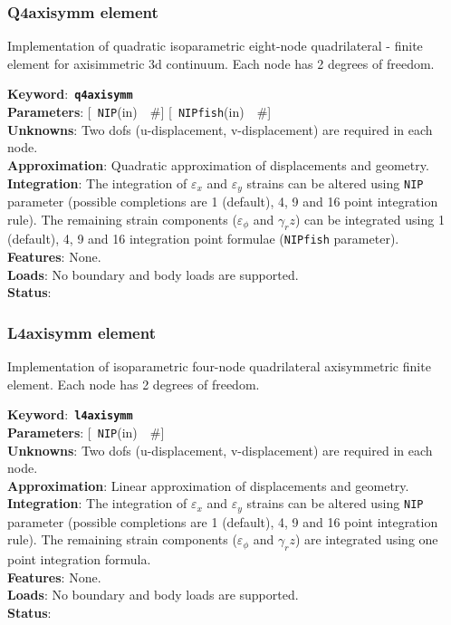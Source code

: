\documentclass[a4paper]{article}
\newcommand{\descitem}[1]{{\noindent \bf #1}:}
\newcommand{\elemkeyword}[1]{\descitem{Keyword}~{\bf \texttt{#1}}}
\newcommand{\elemparam}[2]{{{\texttt{#1}\tiny (#2)}~~\#}}
\newcommand{\optelemparam}[2]{{[~\elemparam{#1}{#2}]}}
\newcommand{\param}[1]{{\texttt{#1}}}
\begin{document}
\subsubsection{Q4axisymm element}
Implementation of quadratic isoparametric eight-node quadrilateral -
finite element for axisimmetric 3d continuum. 
Each node has 2 degrees of freedom.

\elemkeyword{q4axisymm}\\
\descitem{Parameters} \optelemparam{NIP}{in} \optelemparam{NIPfish}{in}\\
\descitem{Unknowns}
Two dofs (u-displacement, v-displacement) are required in each node.\\
\descitem{Approximation} Quadratic approximation of displacements and
geometry.\\
\descitem{Integration}
The integration of $\varepsilon_x$ and $\varepsilon_y$ strains can be altered using
\param{NIP} parameter (possible completions are 1 (default), 4, 9 and 16
point integration rule). The remaining strain components ($\varepsilon_\phi$ and
$\gamma_rz$) can be integrated using 1 (default), 4, 9 and 16 integration
point formulae (\param{NIPfish} parameter).\\
\descitem{Features} None.\\
\descitem{Loads} No boundary and body loads are supported.\\
\descitem{Status} 

\subsubsection{L4axisymm element}
Implementation of isoparametric four-node quadrilateral axisymmetric
finite element. Each node has 2 degrees of freedom.

\elemkeyword{l4axisymm}\\
\descitem{Parameters} \optelemparam{NIP}{in}\\
\descitem{Unknowns}
Two dofs (u-displacement, v-displacement) are required in each node.\\
\descitem{Approximation} Linear approximation of displacements and
geometry.\\
\descitem{Integration}
The integration of $\varepsilon_x$ and $\varepsilon_y$ strains can be altered using
\param{NIP} parameter (possible completions are 1 (default), 4, 9 and 16
point integration rule). The remaining strain components ($\varepsilon_\phi$ and
$\gamma_rz$) are integrated using one point integration formula.\\
\descitem{Features} None.\\
\descitem{Loads} No boundary and body loads are supported.\\
\descitem{Status} 
\end{document}
